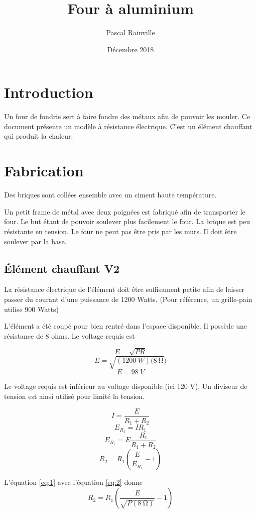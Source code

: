\documentclass{article}
\title{Four à aluminium}
\author{Pascal Rainville }
\date{Décembre 2018}
\begin{document}
\makecustomtitle

\section{Introduction}

Un four de fondrie sert à faire fondre des métaux afin de pouvoir les mouler. Ce document présente un modèle à résistance électrique. C'est un élément chauffant qui produit la chaleur.

\section{Fabrication}

Des briques sont collées ensemble avec un ciment haute température.

Un petit frame de métal avec deux poignées est fabriqué afin de transporter le four. Le but étant de pouvoir soulever plus facilement le four. La brique est peu résistante en tension. Le four ne peut pas être pris par les murs. Il doit être soulever par la base.

\subsection{Élément chauffant V2}

La résistance électrique de l'élément doit être suffisament petite afin de laisser passer du courant d'une puissance de 1200 Watts. (Pour référence, un grille-pain utilise 900 Watts)

L'élément a été coupé pour bien rentré dans l'espace disponible. Il possède une résistance de 8 ohms. Le voltage requis est

\begin{equation} \label{eq:1}
    E = \sqrt{PR}
\end{equation}
\[E = \sqrt{(\SI{1200}{W})(\SI{8}{\ohm}})\]
\[\boxed{E = \SI{98}{V}}\]

Le voltage requis est inférieur au voltage disponible (ici 120 V). Un diviseur de tension est ainsi utilisé pour limité la tension.


\[I = \frac{E}{R_1+R_2}\]
\[E_{R_1} = IR_1\]
\[E_{R_1} = E\frac{R_1}{R_1+R_2}\]
\begin{equation} \label{eq:2}
    R_2 = R_1(\frac{E}{E_{R_1}}-1)
\end{equation}

L'équation \ref{eq:1} avec l'équation \ref{eq:2} donne
\begin{equation}
        R_2 = R_1(\frac{E}{\sqrt{P(\SI{8}{\ohm})}}-1)
\end{equation}
\end{document}
